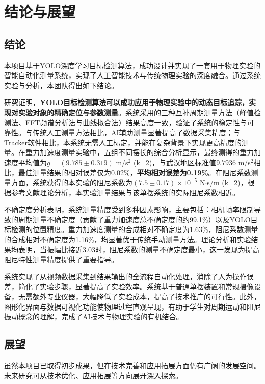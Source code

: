 \section{结论与展望}
\subsection{结论}

本项目基于YOLO深度学习目标检测算法，成功设计并实现了一套用于物理实验的智能自动化测量系统，实现了人工智能技术与传统物理实验的深度融合。通过系统实验与分析，本团队得出如下结论。

研究证明，\textbf{YOLO目标检测算法可以成功应用于物理实验中的动态目标追踪，实现对实验对象的精确定位与参数测量}。系统采用的三种互补周期测量方法（峰值检测法、FFT频谱分析法与曲线拟合法）结果高度一致，验证了系统的稳定性与可靠性。与传统人工测量方法相比，AI辅助测量显著提高了数据采集精度；与Tracker软件相比，本系统无需人工标定，并能在复杂背景下实现更高精度的测量。在重力加速度测量实验中，五组不同摆长的综合分析显示，最终测得的重力加速度平均值为$g = (9.785 \pm 0.319)$ m/s$^2$ (k=2)，与武汉地区标准值$9.7936$ m/s$^2$相比，最佳测量结果的相对误差仅为0.02\%，\textbf{平均相对误差为0.19\%}。在阻尼系数测量方面，系统获得的本实验的阻尼系数为$(7.5 \pm 0.17) \times 10^{-5}$ N$\cdot$s/m (k=2)，根据参考文献\textsuperscript{\cite{WUJS202211018}}理论分析，本实验测量结果与该单摆系统的实际阻尼系数相近。

不确定度分析表明，系统测量精度受到多种因素影响，主要包括：相机帧率限制导致的周期测量不确定度（贡献了重力加速度总不确定度的约99.1\%）以及YOLO目标检测的位置精度。重力加速度测量的合成相对不确定度为1.63\%，阻尼系数测量的合成相对不确定度为1.16\%，均显著优于传统手动测量方法。理论分析和实验结果均表明，当振幅比接近3.03时，阻尼系数的测量不确定度最小，这一发现为提高阻尼特性测量精度提供了重要指导。

系统实现了从视频数据采集到结果输出的全流程自动化处理，消除了人为操作误差，简化了实验步骤，显著提高了实验效率。系统基于普通单摆装置和常规摄像设备，无需额外专业仪器，大幅降低了实验成本，提高了技术推广的可行性。此外，图形化界面与数据可视化功能使物理过程直观呈现，有助于学生对周期运动和阻尼振动概念的理解，完成了AI技术与物理实验的有机结合。


\subsection{展望}

虽然本项目已取得初步成果，但在技术完善和应用拓展方面仍有广阔的发展空间。未来研究可从技术优化、应用拓展等方向展开深入探索。

